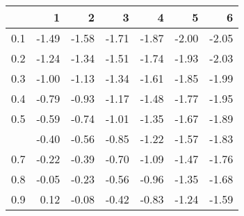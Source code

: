 
\begin{tabular}{lrrrrrr}
\toprule
  & 1 & 2 & 3 & 4 & 5 & 6\\
\midrule
0.1 & -1.49 & -1.58 & -1.71 & -1.87 & -2.00 & -2.05\\
0.2 & -1.24 & -1.34 & -1.51 & -1.74 & -1.93 & -2.03\\
0.3 & -1.00 & -1.13 & -1.34 & -1.61 & -1.85 & -1.99\\
0.4 & -0.79 & -0.93 & -1.17 & -1.48 & -1.77 & -1.95\\
0.5 & -0.59 & -0.74 & -1.01 & -1.35 & -1.67 & -1.89\\
\addlinespace
0.6 & -0.40 & -0.56 & -0.85 & -1.22 & -1.57 & -1.83\\
0.7 & -0.22 & -0.39 & -0.70 & -1.09 & -1.47 & -1.76\\
0.8 & -0.05 & -0.23 & -0.56 & -0.96 & -1.35 & -1.68\\
0.9 & 0.12 & -0.08 & -0.42 & -0.83 & -1.24 & -1.59\\
\bottomrule
\end{tabular}
